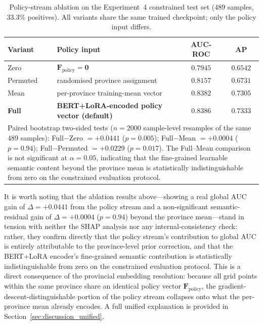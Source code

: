 \documentclass[12pt, a4paper]{article}
\begin{document}
\begin{table}[H]
\centering
\caption{Policy-stream ablation on the Experiment~4 constrained
test set (489 samples, 33.3\% positives). All variants share
the same trained checkpoint; only the policy input differs.}
\label{tab:ablation_policy}
\small
\begin{tabular}{llcc}
\toprule
\textbf{Variant} & \textbf{Policy input} &
\textbf{AUC-ROC} & \textbf{AP} \\
\midrule
Zero      & $\mathbf{F}_\text{policy}=\mathbf{0}$                   & $0.7945$ & $0.6542$ \\
Permuted  & randomised province assignment                         & $0.8157$ & $0.6731$ \\
Mean      & per-province training-mean vector                      & $0.8382$ & $0.7305$ \\
\textbf{Full} & \textbf{BERT+LoRA-encoded policy vector (default)} & $\mathbf{0.8386}$ & $\mathbf{0.7333}$ \\
\bottomrule
\multicolumn{4}{p{0.85\textwidth}}{\small
  Paired bootstrap two-sided tests ($n=2000$ sample-level
  resamples of the same 489 samples): Full$-$Zero
  $=+0.0441$ ($p=0.005$); Full$-$Mean
  $=+0.0004$ ($p=0.94$); Full$-$Permuted
  $=+0.0229$ ($p=0.017$). The Full--Mean comparison is not
  significant at $\alpha=0.05$, indicating that the
  fine-grained learnable semantic content beyond the
  province mean is statistically indistinguishable from
  zero on the constrained evaluation protocol.} \\
\end{tabular}
\end{table}

It is worth noting that the ablation results above---showing
a real global AUC gain of $\Delta=+0.0441$ from the policy
stream and a non-significant semantic-residual gain of
$\Delta=+0.0004$ ($p=0.94$) beyond the province mean---stand
in tension with neither the SHAP analysis nor any
internal-consistency check: rather, they confirm directly
that the policy stream's contribution to global AUC is
entirely attributable to the province-level prior
correction, and that the BERT+LoRA encoder's fine-grained
semantic contribution is statistically indistinguishable from
zero on the constrained evaluation protocol. This is a
direct consequence of the provincial embedding resolution:
because all grid points within the same province share an
identical policy vector $\mathbf{F}_\text{policy}$, the
gradient-descent-distinguishable portion of the policy stream
collapses onto what the per-province mean already encodes. A
full unified explanation is provided in
Section~\ref{sec:discussion_unified}.
\end{document}
